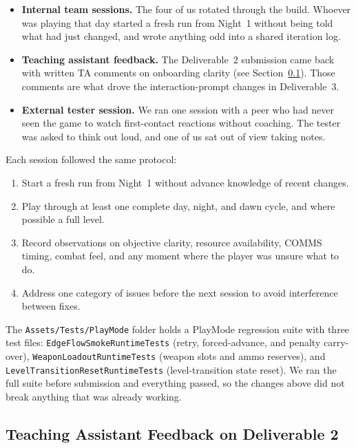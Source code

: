 \documentclass[11pt,a4paper]{article}
\begin{document}
\begin{itemize}[noitemsep]
  \item \textbf{Internal team sessions.} The four of us rotated through the build. Whoever was playing that day started a fresh run from Night~1 without being told what had just changed, and wrote anything odd into a shared iteration log.
  \item \textbf{Teaching assistant feedback.} The Deliverable~2 submission came back with written TA comments on onboarding clarity (see Section~\ref{sec:d2-peer-fb}). Those comments are what drove the interaction-prompt changes in Deliverable~3.
  \item \textbf{External tester session.} We ran one session with a peer who had never seen the game to watch first-contact reactions without coaching. The tester was asked to think out loud, and one of us sat out of view taking notes.
\end{itemize}

Each session followed the same protocol:

\begin{enumerate}[noitemsep]
  \item Start a fresh run from Night~1 without advance knowledge of recent changes.
  \item Play through at least one complete day, night, and dawn cycle, and where possible a full level.
  \item Record observations on objective clarity, resource availability, COMMS timing, combat feel, and any moment where the player was unsure what to do.
  \item Address one category of issues before the next session to avoid interference between fixes.
\end{enumerate}

The \texttt{Assets/Tests/PlayMode} folder holds a PlayMode regression suite with three test files: \texttt{EdgeFlowSmokeRuntimeTests} (retry, forced-advance, and penalty carry-over), \texttt{WeaponLoadoutRuntimeTests} (weapon slots and ammo reserves), and \texttt{LevelTransitionResetRuntimeTests} (level-transition state reset). We ran the full suite before submission and everything passed, so the changes above did not break anything that was already working.

\subsection{Teaching Assistant Feedback on Deliverable 2}
\label{sec:d2-peer-fb}
\end{document}
